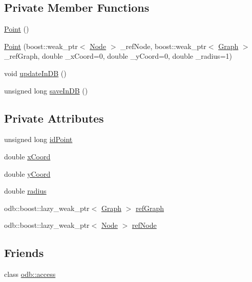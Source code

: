 \subsection*{Private Member Functions}
\begin{DoxyCompactItemize}
\item 
\hyperlink{class_point_ad92f2337b839a94ce97dcdb439b4325a}{Point} ()
\item 
\hyperlink{class_point_a0fd4b8ea6ab319b8998ebcc414620fd4}{Point} (boost\+::weak\+\_\+ptr$<$ \hyperlink{class_node}{Node} $>$ \+\_\+ref\+Node, boost\+::weak\+\_\+ptr$<$ \hyperlink{class_graph}{Graph} $>$ \+\_\+ref\+Graph, double \+\_\+x\+Coord=0, double \+\_\+y\+Coord=0, double \+\_\+radius=1)
\item 
void \hyperlink{class_point_a3a1722e12be59d4390e0eeffe42a1bef}{update\+In\+D\+B} ()
\item 
unsigned long \hyperlink{class_point_a968a3a4ad12af89b0d08b987675128bb}{save\+In\+D\+B} ()
\end{DoxyCompactItemize}
\subsection*{Private Attributes}
\begin{DoxyCompactItemize}
\item 
unsigned long \hyperlink{class_point_ad403ab7101778e018300ebc141d220d8}{id\+Point}
\item 
double \hyperlink{class_point_a88cdf9735cc89d2703e90d087a85629a}{x\+Coord}
\item 
double \hyperlink{class_point_a47f5bf493a270e35fd80b96422469b6d}{y\+Coord}
\item 
double \hyperlink{class_point_af4f987f16754db370e5d1b3d1bf1fd52}{radius}
\item 
odb\+::boost\+::lazy\+\_\+weak\+\_\+ptr$<$ \hyperlink{class_graph}{Graph} $>$ \hyperlink{class_point_aaa2cf5c9426e449b779601807bffad85}{ref\+Graph}
\item 
odb\+::boost\+::lazy\+\_\+weak\+\_\+ptr$<$ \hyperlink{class_node}{Node} $>$ \hyperlink{class_point_a9f3b1208b4f3000d5a44503dd4374e4a}{ref\+Node}
\end{DoxyCompactItemize}
\subsection*{Friends}
\begin{DoxyCompactItemize}
\item 
class \hyperlink{class_point_acb4d953abf85ae525f1d06a0c3a86a55}{odb\+::access}
\end{DoxyCompactItemize}


